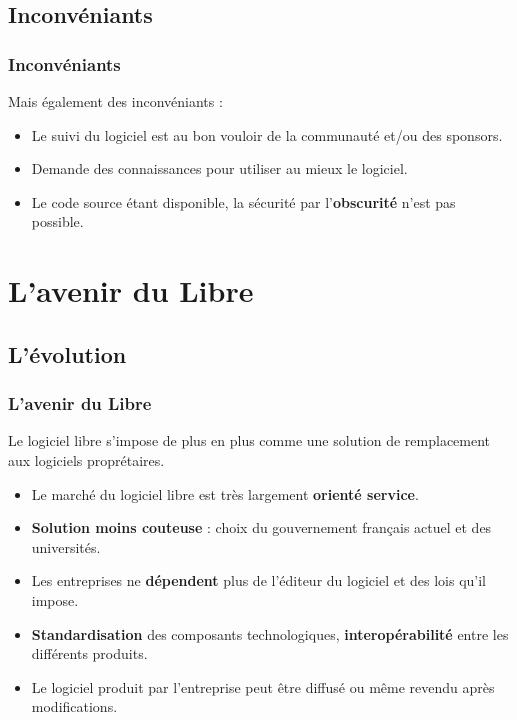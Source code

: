\documentclass{beamer}
\begin{document}
\subsection[Inconvéniants]{Inconvéniants}

\begin{frame}
	\frametitle{Inconvéniants}
	Mais également des inconvéniants :
	\begin{itemize}
		\pause
		\item Le suivi du logiciel est au bon vouloir de la communauté et/ou des sponsors.
		\pause
		\item Demande des connaissances pour utiliser au mieux le logiciel.
		\pause
		\item Le code source étant disponible, la sécurité par l'\textbf{obscurité} n'est pas possible.
	\end{itemize}
\end{frame}

\section[L'avenir du Libre]{L'avenir du Libre}
\subsection[L'évolution]{L'évolution}

\begin{frame}
	\frametitle{L'avenir du Libre}
	Le logiciel libre s'impose de plus en plus comme une solution de remplacement aux logiciels proprétaires.
	
	\begin{itemize}
		\pause
		\item Le marché du logiciel libre est très largement \textbf{orienté service}.
		\pause
		\item \textbf{Solution moins couteuse} : choix du gouvernement français actuel et des universités.
		\pause
		\item Les entreprises ne \textbf{dépendent} plus de l'éditeur du logiciel et des lois qu'il impose.
		\pause
		\item \textbf{Standardisation} des composants technologiques, \textbf{interopérabilité} entre les différents produits.
		\pause
		\item Le logiciel produit par l'entreprise peut être diffusé ou même revendu après modifications.
	\end{itemize}	
\end{frame}
\end{document}

